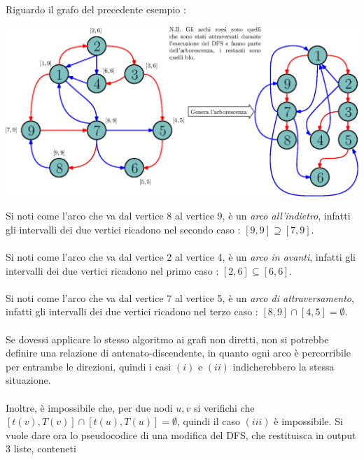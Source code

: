 \documentclass[12pt, letterpaper]{article}
\newcommand{\acc}{\\\hphantom{}\\}
\begin{document}
Riguardo il grafo del precedente esempio : \begin{center}
    \includegraphics[width=1.05\textwidth ]{images/archiArborescenza.eps}
\end{center}
Si noti come l'arco che va dal vertice 8 al vertice 9, è un \textit{arco all'indietro}, infatti gli intervalli dei due
vertici ricadono nel secondo caso : \([9,9]\supseteq[7,9]\).\acc
Si noti come l'arco che va dal vertice 2 al vertice 4, è un \textit{arco in avanti}, infatti gli intervalli dei due
vertici ricadono nel primo caso : \([2,6]\subseteq[6,6]\).\acc
Si noti come l'arco che va dal vertice 7 al vertice 5, è un \textit{arco di attraversamento}, infatti gli intervalli dei due
vertici ricadono nel terzo caso : \([8,9]\cap[4,5]=\emptyset\).\acc
Se dovessi applicare lo stesso algoritmo ai grafi non diretti, non si potrebbe definire una relazione di antenato-discendente,
in quanto ogni arco è percorribile per entrambe le direzioni, quindi i casi \((i)\) e \((ii)\) indicherebbero la stessa
situazione.\acc
Inoltre, è impossibile che, per due nodi \(u,v\) si verifichi che $[t(v),T(v)]\cap[t(u),T(u)]=\emptyset$, quindi
il caso \((iii)\) è impossibile. Si vuole dare ora lo pseudocodice di una modifica del DFS, che restituisca in output 3 liste, conteneti
\end{document}
